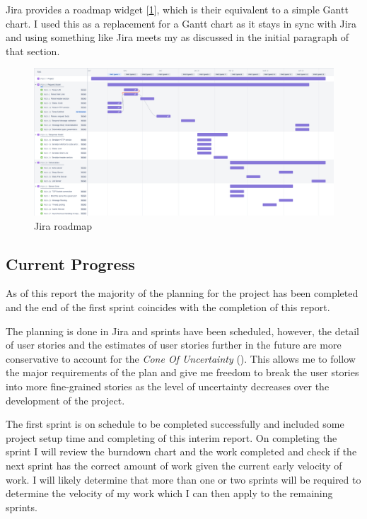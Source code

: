 \documentclass[12pt, a4paper]{article}
\begin{document}
Jira provides a roadmap widget [\ref{fig:jira-roadmap}], which is their equivalent to a
simple Gantt chart. I used this as a replacement for a Gantt chart as it stays in sync with Jira and
using something like Jira meets my \textbf{} as discussed in the initial
paragraph of that section.

\begin{figure}[H]
  \centering 
  \includegraphics[width=1\textwidth]{project-roadmap.png}
  \caption{Jira roadmap}
  \label{fig:jira-roadmap}
\end{figure}

\subsection{Current Progress} \label{ss:current-progress}

As of this report the majority of the planning for the project has been completed and the end of
the first sprint coincides with the completion of this report. 

The planning is done in Jira and sprints have been scheduled, however, the detail of user stories and the
estimates of user stories further in the future are more conservative to account for the
\emph{Cone Of Uncertainty} (\cite{cone-of-uncertainty}). This allows me to follow the major requirements
of the plan and give me freedom to break the user stories into more fine-grained stories as the
level of uncertainty decreases over the development of the project.

The first sprint is on schedule to be completed successfully and included some project setup time
and completing of this interim report. On completing the sprint I will review the burndown chart
and the work completed and check if the next sprint has the correct amount of work given the current
early velocity of work. I will likely determine that more than one or two sprints will be required
to determine the velocity of my work which I can then apply to the remaining sprints.
\end{document}
